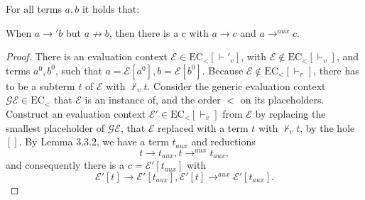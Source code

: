 \begin{lemma}

For all terms $a,b$ it holds that:

When $a \longrightarrow' b$ but $a \not\longrightarrow b$, then there is a $c$ with $a \longrightarrow c$ and $a \longrightarrow^{aux} c$.

\begin{proof}

There is an evaluation context $\mathcal{E} \in \textrm{EC}_<[\vdash'_v]$, with $\mathcal{E} \not\in \textrm{EC}_<[\vdash_v]$, and terms $a^0, b^0$, such that $a = \mathcal{E}[a^0], b = \mathcal{E}[b^0]$. Because $\mathcal{E} \not\in \textrm{EC}_<[\vdash_v]$, there has to be a subterm $t$ of $\mathcal{E}$ with $\not\vdash_v t$. Consider the generic evaluation context $\mathcal{GE} \in \textrm{EC}_<$ that $\mathcal{E}$ is an instance of, and the order $<$ on its placeholders. Construct an evaluation context $\mathcal{E}' \in \textrm{EC}_<[\vdash_v]$ from $\mathcal{E}$ by replacing the smallest placeholder of $\mathcal{GE}$, that $\mathcal{E}$ replaced with a term $t$ with $\not\vdash_v t$, by the hole $[]$. By Lemma 3.3.2, we have a term $t_{aux}$ and reductions
\[
t \longrightarrow t_{aux}, t \longrightarrow^{aux} t_{aux},
\]
and consequently there is a $c = \mathcal{E}'[t_{aux}]$ with
\[
\mathcal{E}'[t] \longrightarrow \mathcal{E}'[t_{aux}], \mathcal{E}'[t] \longrightarrow^{aux} \mathcal{E}'[t_{aux}].
\]

\end{proof}

\end{lemma}

